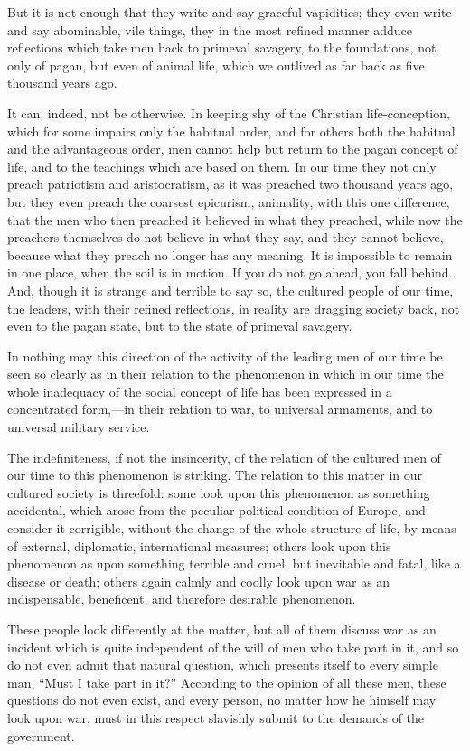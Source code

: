 \documentclass{book}
\begin{document}
But it is not enough that they write and say graceful vapidities; they even write and say abominable, vile things, they in the most refined manner adduce reflections which take men back to primeval savagery, to the foundations, not only of pagan, but even of animal life, which we outlived as far back as five thousand years ago.

It can, indeed, not be otherwise. In keeping shy of the Christian life-conception, which for some impairs only the habitual order, and for others both the habitual and the advantageous order, men cannot help but return to the pagan concept of life, and to the teachings which are based on them. In our time they not only preach patriotism and aristocratism, as it was preached two thousand years ago, but they even preach the coarsest epicurism, animality, with this one difference, that the men who then preached it believed in what they preached, while now the preachers themselves do not believe in what they say, and they cannot believe, because what they preach no longer has any meaning. It is impossible to remain in one place, when the soil is in motion. If you do not go ahead, you fall behind. And, though it is strange and terrible to say so, the cultured people of our time, the leaders, with their refined reflections, in reality are dragging society back, not even to the pagan state, but to the state of primeval savagery.

In nothing may this direction of the activity of the leading men of our time be seen so clearly as in their relation to the phenomenon in which in our time the whole inadequacy of the social concept of life has been expressed in a concentrated form,—in their relation to war, to universal armaments, and to universal military service.

The indefiniteness, if not the insincerity, of the relation of the cultured men of our time to this phenomenon is striking. The relation to this matter in our cultured society is threefold: some look upon this phenomenon as something accidental, which arose from the peculiar political condition of Europe, and consider it corrigible, without the change of the whole structure of life, by means of external, diplomatic, international measures; others look upon this phenomenon as upon something terrible and cruel, but inevitable and fatal, like a disease or death; others again calmly and coolly look upon war as an indispensable, beneficent, and therefore desirable phenomenon.

These people look differently at the matter, but all of them discuss war as an incident which is quite independent of the will of men who take part in it, and so do not even admit that natural question, which presents itself to every simple man, “Must I take part in it?” According to the opinion of all these men, these questions do not even exist, and every person, no matter how he himself may look upon war, must in this respect slavishly submit to the demands of the government.
\end{document}
